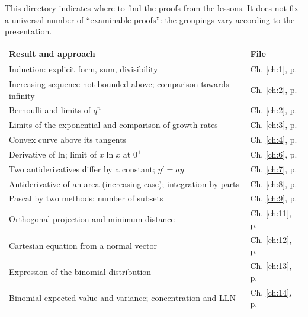 This directory indicates where to find the proofs from the lessons. It does not fix a universal number of ``examinable proofs'': the groupings vary according to the presentation.
\begin{longtable}{@{}p{}p{}@{}}\toprule\textbf{Result and approach}&\textbf{File}\\\midrule\endhead
Induction: explicit form, sum, divisibility&Ch. \ref{ch:1}, p. \pageref{ch:1}\\
Increasing sequence not bounded above; comparison towards infinity&Ch. \ref{ch:2}, p. \pageref{ch:2}\\
Bernoulli and limits of $q^n$&Ch. \ref{ch:2}, p. \pageref{ch:2}\\
Limits of the exponential and comparison of growth rates&Ch. \ref{ch:3}, p. \pageref{ch:3}\\
Convex curve above its tangents&Ch. \ref{ch:4}, p. \pageref{ch:4}\\
Derivative of ln; limit of $x\ln x$ at $0^+$&Ch. \ref{ch:6}, p. \pageref{ch:6}\\
Two antiderivatives differ by a constant; $y'=ay$&Ch. \ref{ch:7}, p. \pageref{ch:7}\\
Antiderivative of an area (increasing case); integration by parts&Ch. \ref{ch:8}, p. \pageref{ch:8}\\
Pascal by two methods; number of subsets&Ch. \ref{ch:9}, p. \pageref{ch:9}\\
Orthogonal projection and minimum distance&Ch. \ref{ch:11}, p. \pageref{ch:11}\\
Cartesian equation from a normal vector&Ch. \ref{ch:12}, p. \pageref{ch:12}\\
Expression of the binomial distribution&Ch. \ref{ch:13}, p. \pageref{ch:13}\\
Binomial expected value and variance; concentration and LLN&Ch. \ref{ch:14}, p. \pageref{ch:14}\\\bottomrule\end{longtable}
